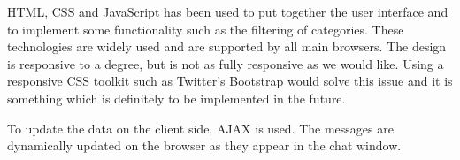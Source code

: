 \documentclass{sig-alt-release2}
\begin{document}
HTML, CSS and JavaScript has been used to put together the user interface and to implement some functionality such as the filtering of categories. These technologies are widely used and are supported by all main browsers. The design is responsive to a degree, but is not as fully responsive as we would like. Using a responsive CSS toolkit such as Twitter's Bootstrap would solve this issue and it is something which is definitely to be implemented in the future. 

To update the data on the client side, AJAX is used. The messages are dynamically updated on the browser as they appear in the chat window. 


\end{document}
